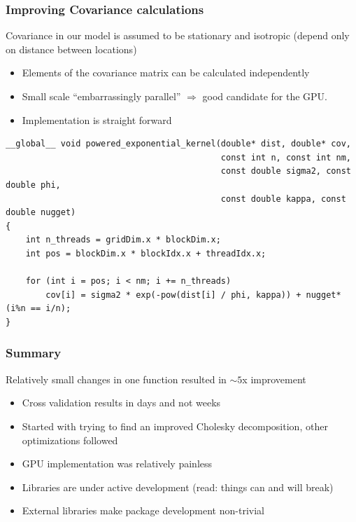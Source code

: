 \documentclass[slidestop,mathserif]{beamer}
\begin{document}
\begin{frame}[fragile]
\frametitle{Improving Covariance calculations}

Covariance in our model is assumed to be stationary and isotropic (depend only on distance between locations)
\begin{itemize}
\item Elements of the covariance matrix can be calculated independently
\item Small scale ``embarrassingly parallel'' $\Rightarrow$ good candidate for the GPU.
\item Implementation is straight forward
\end{itemize}


\pause

\begin{block}{}
{\scriptsize
\begin{verbatim}
__global__ void powered_exponential_kernel(double* dist, double* cov,
                                           const int n, const int nm,
                                           const double sigma2, const double phi,
                                           const double kappa, const double nugget) 
{
    int n_threads = gridDim.x * blockDim.x;
    int pos = blockDim.x * blockIdx.x + threadIdx.x;

    for (int i = pos; i < nm; i += n_threads)
        cov[i] = sigma2 * exp(-pow(dist[i] / phi, kappa)) + nugget*(i%n == i/n);
}
\end{verbatim}
}
\end{block}

\end{frame}


\begin{frame}
\frametitle{Summary}

Relatively small changes in one function resulted in $\sim 5$x improvement
\begin{itemize}
\item Cross validation results in days and not weeks
\item Started with trying to find an improved Cholesky decomposition, other optimizations followed
\item GPU implementation was relatively painless
\item Libraries are under active development (read: things can and will break)
\item External libraries make package development non-trivial
\end{itemize}

\end{frame}
\end{document}
